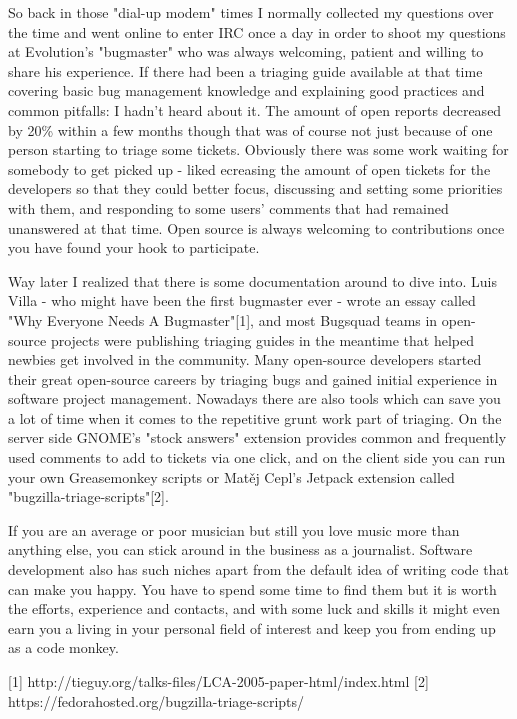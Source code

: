 So back in those "dial-up modem" times I normally collected my questions over the time and went online to enter IRC once a day in order to shoot my questions at Evolution's "bugmaster" who was always welcoming, patient and willing to share his experience. If there had been a triaging guide available at that time covering basic bug management knowledge and explaining good practices and common pitfalls: I hadn't heard about it.
The amount of open reports decreased by 20\% within a few months though that was of course not just because of one person starting to triage some tickets. Obviously there was some work waiting for somebody to get picked up - liked ecreasing the amount of open tickets for the developers so that they could better focus, discussing and setting some priorities with them, and responding to some users' comments that had remained unanswered at that time. Open source is always welcoming to contributions once you have found your hook to participate.

Way later I realized that there is some documentation around to dive into. Luis Villa - who might have been the first bugmaster ever - wrote an essay called "Why Everyone Needs A Bugmaster"[1], and most Bugsquad teams in open-source projects were publishing triaging guides in the meantime that helped newbies get involved in the community. Many open-source developers started their great open-source careers by triaging bugs and gained initial experience in software project management.
Nowadays there are also tools which can save you a lot of time when it comes to the repetitive grunt work part of triaging. On the server side GNOME's "stock answers" extension provides common and frequently used comments to add to tickets via one click, and on the client side you can run your own Greasemonkey scripts or Matěj Cepl's Jetpack extension called "bugzilla-triage-scripts"[2].

If you are an average or poor musician but still you love music more than anything else, you can stick around in the business as a journalist.
Software development also has such niches apart from the default idea of writing code that can make you happy. You have to spend some time to find them but it is worth the efforts, experience and contacts, and with some luck and skills it might even earn you a living in your personal field of interest and keep you from ending up as a code monkey.

[1] http://tieguy.org/talks-files/LCA-2005-paper-html/index.html
[2] https://fedorahosted.org/bugzilla-triage-scripts/
